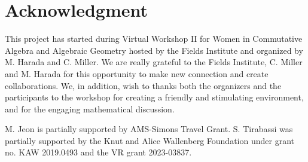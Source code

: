 \documentclass[11pt,letter]{amsart}
\numberwithin{equation}{section}
\begin{document}
%
%
%
%
\section*{Acknowledgment}
This project has started during Virtual Workshop II for Women in Commutative Algebra and Algebraic Geometry hosted by the Fields Institute and organized by M. Harada and C. Miller. We are really grateful to the Fields Institute, C. Miller and M. Harada for this opportunity to make new connection and create collaborations. We, in addition, wish to thanks both the organizers and the participants to the workshop for creating a friendly and stimulating environment, and for the engaging mathematical discussion. %


 M. Jeon is partially supported by AMS-Simons Travel Grant. S. Tirabassi was partially supported by the Knut and Alice Wallenberg Foundation under grant no. KAW 2019.0493 and the VR grant 2023-03837.


\end{document}
